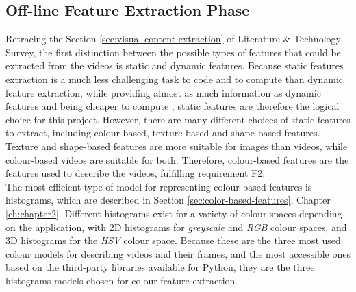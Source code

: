 \subsection{Off-line Feature Extraction Phase}
\label{sec:design-offline-feature-extraction}

Retracing the Section \ref{sec:visual-content-extraction} of Literature \& Technology Survey, the first distinction between the possible types of features that could be extracted from the videos is static and dynamic features. Because static features extraction is a much less challenging task to code and to compute than dynamic feature extraction, while providing almost as much information as dynamic features and being cheaper to compute \cite{hu2011survey}, static features are therefore the logical choice for this project. However, there are many different choices of static features to extract, including colour-based, texture-based and shape-based features. Texture and shape-based features are more suitable for images than videos, while colour-based videos are suitable for both. Therefore, colour-based features are the features used to describe the videos, fulfilling requirement F2.\\

The most efficient type of model for representing colour-based features is histograms, which are described in Section \ref{sec:color-based-features}, Chapter \ref{ch:chapter2}. Different histograms exist for a variety of colour spaces depending on the application, with 2D histograms for \textit{greyscale} and \textit{RGB} colour spaces, and 3D histograms for the \textit{HSV} colour space. Because these are the three most used colour models for describing videos and their frames, and the most accessible ones based on the third-party libraries available for Python, they are the three histograms models chosen for colour feature extraction.\\ 

